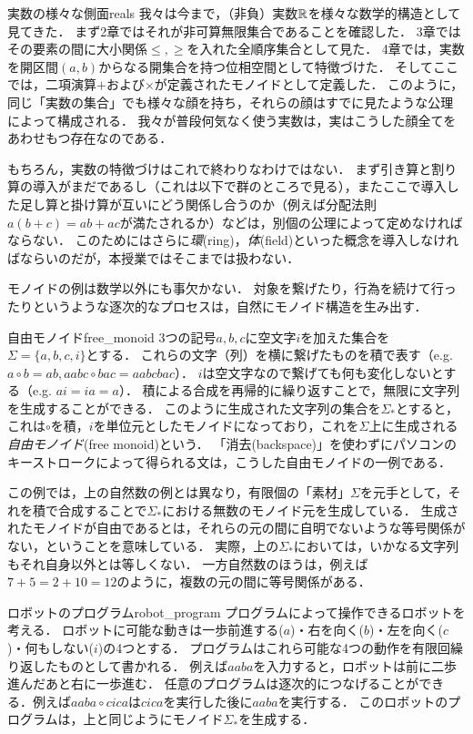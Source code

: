 \documentclass[11pt,a4paper, dvipdfmx]{jsarticle}
\begin{document}
\begin{hatten}{実数の様々な側面}{reals}
我々は今まで，（非負）実数$\mathbb{R}$を様々な数学的構造として見てきた．
まず2章ではそれが非可算無限集合であることを確認した．
3章ではその要素の間に大小関係$\leq, \geq$を入れた全順序集合として見た．
4章では，実数を開区間$(a,b)$からなる開集合を持つ位相空間として特徴づけた．
そしてここでは，二項演算$+$および$\times$が定義されたモノイドとして定義した．
このように，同じ「実数の集合」でも様々な顔を持ち，それらの顔はすでに見たような公理によって構成される．
我々が普段何気なく使う実数は，実はこうした顔全てをあわせもつ存在なのである．

 もちろん，実数の特徴づけはこれで終わりなわけではない．
 まず引き算と割り算の導入がまだであるし（これは以下で群のところで見る），またここで導入した足し算と掛け算が互いにどう関係し合うのか（例えば分配法則$a(b+c) = ab + ac$が満たされるか）などは，別個の公理によって定めなければならない．
 このためにはさらに\emph{環}(ring)，\emph{体}(field)といった概念を導入しなければならいのだが，本授業ではそこまでは扱わない．
\end{hatten}

モノイドの例は数学以外にも事欠かない．
対象を繋げたり，行為を続けて行ったりというような逐次的なプロセスは，自然にモノイド構造を生み出す．

\begin{rei}{自由モノイド}{free_monoid}
3つの記号$a, b, c$に空文字$i$を加えた集合を$\Sigma = \{a, b, c, i \}$とする．
これらの文字（列）を横に繋げたものを積で表す（e.g. $a \circ b = ab, aabc \circ bac = aabcbac$）．
$i$は空文字なので繋げても何も変化しないとする（e.g. $ai = ia = a$）．
積による合成を再帰的に繰り返すことで，無限に文字列を生成することができる．
このように生成された文字列の集合を$\Sigma_*$とすると，これは$\circ$を積，$i$を単位元としたモノイドになっており，これを$\Sigma$上に生成される\emph{自由モノイド}(free monoid)という．
「消去(backspace)」を使わずにパソコンのキーストロークによって得られる文は，こうした自由モノイドの一例である．
\end{rei}

この例では，上の自然数の例とは異なり，有限個の「素材」$\Sigma$を元手として，それを積で合成することで$\Sigma_*$における無数のモノイド元を生成している．
生成されたモノイドが自由であるとは，それらの元の間に自明でないような等号関係がない，ということを意味している．
実際，上の$\Sigma_*$においては，いかなる文字列もそれ自身以外とは等しくない．
一方自然数のほうは，例えば$7 + 5 = 2 + 10 = 12$のように，複数の元の間に等号関係がある．


\begin{rei}{ロボットのプログラム}{robot_program}
プログラムによって操作できるロボットを考える．
ロボットに可能な動きは一歩前進する($a$)・右を向く($b$)・左を向く($c$)・何もしない($i$)の4つとする．
プログラムはこれら可能な4つの動作を有限回繰り返したものとして書かれる．
例えば$aaba$を入力すると，ロボットは前に二歩進んだあと右に一歩進む．
任意のプログラムは逐次的につなげることができる．例えば$aaba \circ cica$は$cica$を実行した後に$aaba$を実行する．
このロボットのプログラムは，上と同じようにモノイド$\Sigma_*$を生成する．
\end{rei}
\end{document}
